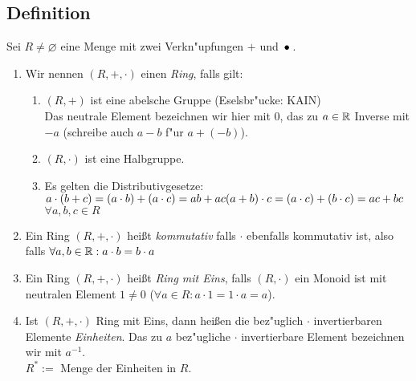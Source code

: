 \subsection[Definition: Ring]{Definition} \label{ring}
Sei $R \neq \varnothing$ eine Menge mit zwei Verkn"upfungen $+$ und $\,{\bullet}\,$.
{\renewcommand{\labelenumi}{(\roman{enumi})}
\begin{enumerate}
	\item
	Wir nennen $(R, +, \cdot)$ einen \emph{Ring}, falls gilt:
	{\renewcommand{\labelenumi}{\arabic{enumi})}\begin{enumerate}
		\item
		$(R,+)$ ist eine abelsche Gruppe (Eselsbr"ucke: KAIN)\\
		Das neutrale Element bezeichnen wir hier mit $0$, das zu $a \in \mathbb{R}$ Inverse mit $-a$ (schreibe auch $a-b$ f"ur $a+(-b)$).
		\item
		$(R,\cdot)$ ist eine Halbgruppe.
		\item
		Es gelten die Distributivgesetze:\\
		$a\cdot (b+c) = (a \cdot b) + (a \cdot c) = ab + ac\\
		(a+b) \cdot c = (a \cdot c) + (b \cdot c) = ac + bc$ \qquad $\forall a, b, c \in R$
	\end{enumerate}}
	\item
	Ein Ring $(R,+, \cdot)$ heißt \emph{kommutativ} falls $\cdot$ ebenfalls kommutativ ist, also falls ${\forall a,b \in \mathbb{R}: a \cdot b = b \cdot a}$
	\item
	Ein Ring $(R,+, \cdot)$ heißt \emph{Ring mit Eins}, falls $(R, \cdot)$ ein Monoid ist mit neutralen Element $1\neq 0$ \;($\forall a \in R: a \cdot 1 = 1 \cdot a = a$).
	\item
	Ist $(R, +, \cdot)$ Ring mit Eins, dann heißen die bez"uglich $\cdot$ invertierbaren Elemente \emph{Einheiten}. Das zu $a$ bez"ugliche $\cdot$
	invertierbare Element bezeichnen wir mit $a^{-1}$.\\ $R^* :=$ Menge der Einheiten in $R$.
\end{enumerate}}
